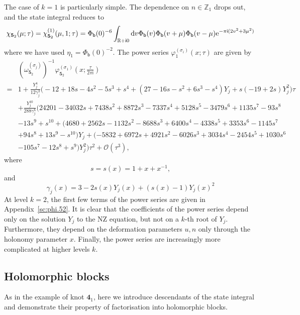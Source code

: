 \documentclass[a4paper,11pt]{article}	%
\def\md{\mathbf}
\def\ms{\mathsf}
\def\IR{\mathbb{R}}
\def\IZ{\mathbb{Z}}
\def\cO{\mathcal{O}}
\newcommand{\re}{{\rm e}}
\newcommand{\ri}{{\mathsf{i}}}
\newcommand{\rd}{{\rm d}}
\newcommand{\nn}{\nonumber \\}
\newcommand{\bb}{\ms{b}}
\newcommand{\s}{\sigma}
\newcommand{\knot}[1]{\md{#1}}
\def\jjj#1{$\spadesuit\spadesuit$ \emph{\textcolor{red}{#1}}
  $\spadesuit\spadesuit$}
\begin{document}
The case of $k=1$ is particularly simple.  The dependence on
$n\in\IZ_1$ drops out, and the state integral reduces to
\cite{Garoufalidis:2020xec}
\begin{equation}
  \chi_{\knot{5}_2}(\mu;\tau) = \chi_{\knot{5}_2}^{(1)}(\mu,1;\tau)
  =\Phi_{\bb}(0)^{-6}\int_{\IR+\ri 0}\rd v \Phi_\bb(v)\Phi_\bb(v+\mu)\Phi_\bb(v-\mu)
  \re^{-\pi\ri(2v^2+3\mu^2)}
\end{equation}
where we have used $\eta_1 = \Phi_\bb(0)^{-2}$.  The power series
$\varphi_1^{(\s_i)}(x;\tau)$ are given by \cite{Garoufalidis:2020xec}
\begin{align}
  &(\omega_{\knot{5}_2}^{(\s_j)})^{-1}\varphi_{\knot{5}_2}^{(\s_1)}
    (x;\frac{\tau}{2\pi\ri})
    \nn=
  &1 + \frac{Y_j^4}
    {12\gamma_j^3}
    \Big(-12+18s-4s^2-5s^3+s^4+(27-16s-s^2+6s^3-s^4)Y_j+s(-19+2s)Y_j^2\Big)\tau
    \nn
  &+\frac{Y_j^{10}}{288\gamma_j^6}\Big(
    24201-34032s+7438s^2+8872s^3-7337s^4+5128s^5-3479s^6+1135s^7-93s^8\nn
  &-13s^9+s^{10}
    +(4680+2562s-1132s^2-8688s^3+6400s^4-4338s^5+3353s^6-1145s^7\nn
  &+94s^8+13s^9-s^{10})Y_j
    +(-5832+6972s+4921s^2-6026s^3+3034s^4-2454s^5+1030s^6\nn
  &-105s^7-12s^8+s^9)Y_j^2 \Big)\tau^2+\cO(\tau^3),
\end{align}
where
\begin{equation}
  s=s(x) = 1+x+x^{-1},
\end{equation}
and
\begin{equation}
  \gamma_j(x) = 3-2s(x)Y_j(x) + (s(x)-1)Y_j(x)^2
\end{equation}
At level $k=2$, the first few terms of the power series are given in
Appendix~\ref{sc:phi.52}.  It is clear that the coefficients of the
power series depend only on the solution $Y_j$ to the NZ equation, but
not on a $k$-th root of $Y_j$.  Furthermore, they depend on the
deformation parameters $u,n$ only through the holonomy parameter $x$.
Finally, the power series are increasingly more complicated at higher
levels $k$.

\subsection{Holomorphic blocks}
\label{sc:52.blocks}

As in the example of knot $\knot{4}_1$, here we introduce descendants
of the state integral and demonstrate their property of factorisation
into holomorphic blocks.
\end{document}

